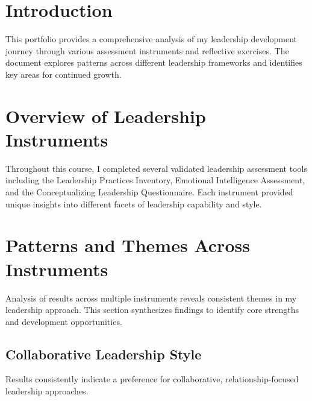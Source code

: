 \documentclass[12pt]{report}
\begin{document}
\renewcommand{\cftsecfont}{\color{dodblue}}
\renewcommand{\cftsecpagefont}{\color{dodblue}}
\renewcommand{\cftsecleader}{\cftdotfill{\cftdotsep}}

\renewcommand{\cftsubsecfont}{\color{dodblue}}
\renewcommand{\cftsubsecpagefont}{\color{dodblue}}
\renewcommand{\cftsubsecleader}{\cftdotfill{\cftdotsep}}

\setlength{\cftbeforesecskip}{0.3em}
\setlength{\cftbeforesubsecskip}{0.2em}

\tableofcontents
\newpage

\section{Introduction}
This portfolio provides a comprehensive analysis of my leadership development journey through various assessment instruments and reflective exercises. The document explores patterns across different leadership frameworks and identifies key areas for continued growth.


\section{Overview of Leadership Instruments}
Throughout this course, I completed several validated leadership assessment tools including the Leadership Practices Inventory, Emotional Intelligence Assessment, and the Conceptualizing Leadership Questionnaire. Each instrument provided unique insights into different facets of leadership capability and style.


\section{Patterns and Themes Across Instruments}
Analysis of results across multiple instruments reveals consistent themes in my leadership approach. This section synthesizes findings to identify core strengths and development opportunities.


\subsection{Collaborative Leadership Style}
Results consistently indicate a preference for collaborative, relationship-focused leadership approaches.
\end{document}

